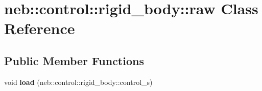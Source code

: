 \hypertarget{classneb_1_1control_1_1rigid__body_1_1raw}{
\section{neb::control::rigid\_\-body::raw Class Reference}
\label{classneb_1_1control_1_1rigid__body_1_1raw}
}
\subsection*{Public Member Functions}
\begin{DoxyCompactItemize}
\item 
\hypertarget{classneb_1_1control_1_1rigid__body_1_1raw_a79de740ae20967e3e3e3139c85766f41}{
void {\bfseries load} (neb::control::rigid\_\-body::control\_\-s)}
\label{classneb_1_1control_1_1rigid__body_1_1raw_a79de740ae20967e3e3e3139c85766f41}

\end{DoxyCompactItemize}
